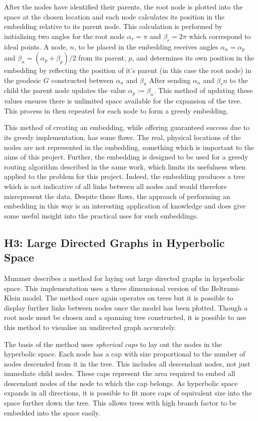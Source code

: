 After the nodes have identified their parents, the root node is plotted into the space at the chosen location and each node calculates its position in the embedding relative to its parent node. This calculation is performed by initialising two angles for the root node $\alpha_r = \pi$ and $\beta_r = 2\pi$ which correspond to ideal points. A node, $n$, to be placed in the embedding receives angles $\alpha_n = \alpha_p$ and $\beta_n = (\alpha_p + \beta_p) /2$ from its parent, $p$, and determines its own position in the embedding by reflecting the position of it's parent (in this case the root node) in the geodesic $G$ constructed between $\alpha_n$ and $\beta_n$ After sending $\alpha_n$ and $\beta_rn$ to the child the parent node updates the value $\alpha_p := \beta_n$. This method of updating these values ensures there is unlimited space available for the expansion of the tree. This process in then repeated for each node to form a greedy embedding. 

This method of creating an embedding, while offering guaranteed success due to its greedy implementation, has some flaws. The real, physical locations of the nodes are not represented in the embedding, something which is important to the aims of this project. Further, the embedding is designed to be used for a greedy routing algorithm described in the same work, which limits its usefulness when applied to the problem for this project. Indeed, the embedding produces a tree which is not indicative of all links between all nodes and would therefore misrepresent the data. Despite these flaws, the approach of performing an embedding in this way is an interesting application of knowledge and does give some useful insight into the practical uses for such embeddings. 

\subsection{H3: Large Directed Graphs in Hyperbolic Space}

Munzner \cite{munzner_h3_1997} describes a method for laying out large directed graphs in hyperbolic space. This implementation uses a three dimensional version of the Beltrami-Klein model. The method once again operates on trees but it is possible to display further links between nodes once the model has been plotted. Though a root node must be chosen and a spanning tree constructed, it is possible to use this method to visualise an undirected graph accurately. 

The basis of the method uses \textit{spherical caps} to lay out the nodes in the hyperbolic space. Each node has a cap with size proportional to the number of nodes descended from it in the tree. This includes all descendant nodes, not just immediate child nodes. These caps represent the area required to embed all descendant nodes of the node to which the cap belongs. As hyperbolic space expands in all directions, it is possible to fit more caps of equivalent size into the space further down the tree. This allows trees with high branch factor to be embedded into the space easily.

